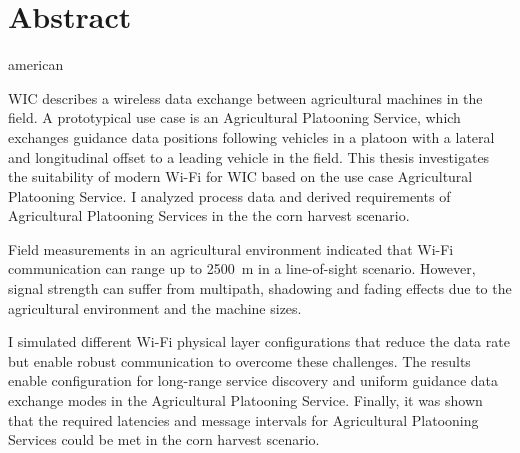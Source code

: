 \chapter*{Abstract}
\begin{otherlanguage*}{american}

\begin{comment}
    about 1/2 page:
\begin{enumerate}
    \item Motivation (Why do we care?)
    \item Problem statement (What problem are we trying to solve?)
    \item Approach (How did we go about it)
    \item Results (What's the answer?)
    \item Conclusion (What are the implications of the answer?)
\end{enumerate}

The abstract is a miniature version of the thesis.
It should be treated as an entirely separate document.
Do not assume that a reader who has access to an abstract will also have access to the thesis.
Do not assume that a reader who reads the thesis has read the abstract.

\end{comment}


\ac{WIC} describes a wireless data exchange between agricultural machines in the field.
A prototypical use case is an Agricultural Platooning Service, which exchanges guidance data positions following
vehicles in a platoon with a lateral and longitudinal offset to a leading vehicle in the field.
This thesis investigates the suitability of modern Wi-Fi for \ac{WIC} based on the use case Agricultural Platooning Service.
I analyzed process data and derived requirements of Agricultural Platooning Services in the the corn harvest scenario.

Field measurements in an agricultural environment indicated that Wi-Fi communication can range up to \SI{2500}{\metre} in
a line-of-sight scenario.
However, signal strength can suffer from multipath, shadowing and fading effects due to the
agricultural environment and the machine sizes.


I simulated different Wi-Fi physical layer configurations that reduce the data rate but
enable robust communication to overcome these challenges.
The results enable configuration for long-range service discovery and uniform guidance data exchange modes
in the Agricultural Platooning Service.
Finally, it was shown that the required latencies and message intervals for Agricultural Platooning Services could be met in the corn harvest
scenario.

\end{otherlanguage*}

